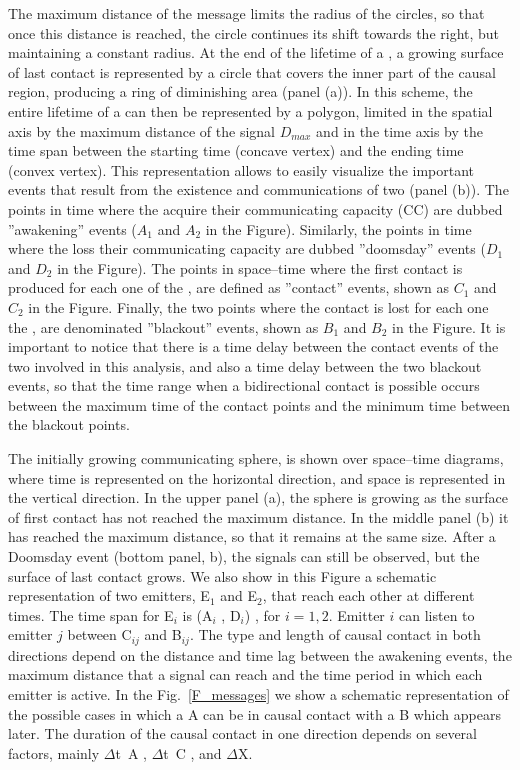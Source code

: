 %
The maximum distance of the message limits the radius of the circles,
so that once this distance is reached, the circle continues its shift
towards the right, but maintaining a constant radius.
%
At the end of the lifetime of a \ceti, a growing surface of last
contact is represented by a circle that covers the inner part of the
causal region, producing a ring of diminishing area (panel (a)).
%
In this scheme, the entire lifetime of a \ceti can then be represented
by a polygon, limited in the spatial axis by the maximum distance of
the signal $D_{max}$ and in the time axis by the time span between the
starting time (concave vertex) and the ending time (convex vertex).
%
This representation allows to easily visualize the important events
that result from the existence and communications of two \cetis (panel
(b)).
%
The points in time where the \cetis acquire their communicating capacity
(CC) are dubbed ''awakening'' events ($A_1$ and $A_2$ in the Figure).
%
Similarly, the points in time where the \cetis loss their
communicating capacity are dubbed ''doomsday'' events ($D_1$ and $D_2$
in the Figure).
%
The points in space--time where the first contact is produced for each
one of the \cetis, are defined as ''contact'' events, shown as $C_1$
and $C_2$ in the Figure.
%
Finally, the two points where the contact is lost for each one the
\cetis, are denominated ''blackout'' events, shown as $B_1$ and $B_2$
in the Figure.
%
It is important to notice that there is a time delay between the
contact events of the two \cetis involved in this analysis, and also a
time delay between the two blackout events, so that the time range
when a bidirectional contact is possible occurs between the maximum
time of the contact points and the minimum time between the blackout
points.




The initially growing communicating sphere, is shown over
space--time diagrams, where time is represented on the horizontal
direction, and space is represented in the vertical direction.
%
In the upper panel (a), the sphere is growing as the surface of first
contact has not reached the maximum distance.
%
In the middle panel (b) it has reached the maximum distance, so that
it remains at the same size.
%
After a Doomsday event (bottom panel, b), the signals can still be
observed, but the surface of last contact grows.
%
We also show in this Figure a schematic representation of two
emitters, E$_1$ and E$_2$, that reach each other at different times.
%
The time span for E$_i$ is (A$_i$ , D$_i$) , for $i = {1, 2}$.
%
Emitter $i$ can listen to emitter $j$ between C$_{ij}$ and B$_{ij}$.
%
The type and length of causal contact in both directions depend on the
distance and time lag between the awakening events, the maximum
distance that a signal can reach and the time period in which each
emitter is active.
%
In the Fig.~\ref{F_messages} we show a schematic representation of the
possible cases in which a \ceti A can be in causal contact with a
\ceti
B which appears later.
%
The duration of the causal contact in one direction depends on several
factors, mainly $\Delta$t~A , $\Delta$t~C , and $\Delta$X.


